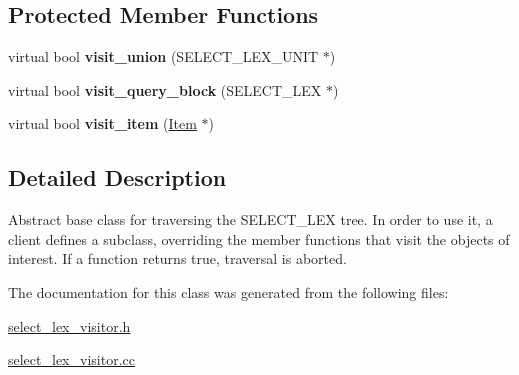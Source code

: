 \subsection*{Protected Member Functions}
\begin{DoxyCompactItemize}
\item 
\mbox{\label{classSelect__lex__visitor_a3daf48ca2a592eeb2002ebdad547be68}} 
virtual bool {\bfseries visit\+\_\+union} (S\+E\+L\+E\+C\+T\+\_\+\+L\+E\+X\+\_\+\+U\+N\+IT $\ast$)
\item 
\mbox{\label{classSelect__lex__visitor_a29c3c8f1fb89974f0362617b168fb93b}} 
virtual bool {\bfseries visit\+\_\+query\+\_\+block} (S\+E\+L\+E\+C\+T\+\_\+\+L\+EX $\ast$)
\item 
\mbox{\label{classSelect__lex__visitor_a5556379fa02c37f3842025b2096b34ba}} 
virtual bool {\bfseries visit\+\_\+item} (\mbox{\hyperlink{classItem}{Item}} $\ast$)
\end{DoxyCompactItemize}


\subsection{Detailed Description}
Abstract base class for traversing the S\+E\+L\+E\+C\+T\+\_\+\+L\+EX tree. In order to use it, a client defines a subclass, overriding the member functions that visit the objects of interest. If a function returns true, traversal is aborted. 

The documentation for this class was generated from the following files\+:\begin{DoxyCompactItemize}
\item 
\mbox{\hyperlink{select__lex__visitor_8h}{select\+\_\+lex\+\_\+visitor.\+h}}\item 
\mbox{\hyperlink{select__lex__visitor_8cc}{select\+\_\+lex\+\_\+visitor.\+cc}}\end{DoxyCompactItemize}
